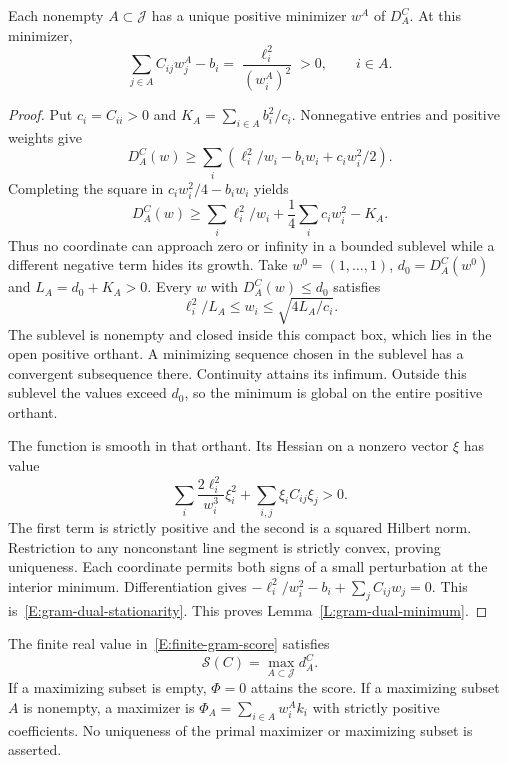 \begin{lemma}\label{L:gram-dual-minimum}
  Each nonempty $A\subset\mathcal J$ has a unique positive minimizer
  $w^A$ of $D_A^C$. At this minimizer,
  \begin{equation}\label{E:gram-dual-stationarity}
    \sum_{j\in A}C_{ij}w_j^A-b_i
    =\frac{\ell_i^2}{(w_i^A)^2}>0,\qquad i\in A.
  \end{equation}
\end{lemma}

\begin{proof}
  Put $c_i=C_{ii}>0$ and $K_A=\sum_{i\in A}b_i^2/c_i$.
  Nonnegative entries and positive weights give
  \[
    D_A^C(w)\ge
    \sum_i\left(\ell_i^2/w_i-b_iw_i+c_iw_i^2/2\right).
  \]
  Completing the square in $c_iw_i^2/4-b_iw_i$ yields
  \begin{equation}\label{E:gram-dual-coercivity}
    D_A^C(w)\ge
    \sum_i\ell_i^2/w_i+\frac14\sum_i c_iw_i^2-K_A.
  \end{equation}
  Thus no coordinate can approach zero or infinity in a bounded sublevel
  while a different negative term hides its growth.
  Take $w^0=(1,\ldots,1)$, $d_0=D_A^C(w^0)$ and $L_A=d_0+K_A>0$.
  Every $w$ with $D_A^C(w)\le d_0$ satisfies
  \[
    \ell_i^2/L_A\le w_i\le\sqrt{4L_A/c_i}.
  \]
  The sublevel is nonempty and closed inside this compact box, which
  lies in the open positive orthant. A minimizing sequence chosen in
  the sublevel has a convergent subsequence there. Continuity attains
  its infimum. Outside this sublevel the values exceed $d_0$, so the
  minimum is global on the entire positive orthant.

  The function is smooth in that orthant.
  Its Hessian on a nonzero vector $\xi$ has value
  \[
    \sum_i\frac{2\ell_i^2}{w_i^3}\xi_i^2
    +\sum_{i,j}\xi_iC_{ij}\xi_j>0.
  \]
  The first term is strictly positive and the second is a squared
  Hilbert norm. Restriction to any nonconstant line segment is
  strictly convex, proving uniqueness.
  Each coordinate permits both signs of a small perturbation at the
  interior minimum. Differentiation gives
  $-\ell_i^2/w_i^2-b_i+\sum_jC_{ij}w_j=0$.
  This is~\eqref{E:gram-dual-stationarity}.
  This proves Lemma~\ref{L:gram-dual-minimum}.
\end{proof}

\begin{proposition}\label{P:gram-positive-optimizer}
  The finite real value in~\eqref{E:finite-gram-score} satisfies
  \begin{equation}\label{E:gram-active-duality}
    \mathscr S(C)=\max_{A\subset\mathcal J}d_A^C .
  \end{equation}
  If a maximizing subset is empty, $\Phi=0$ attains the score.
  If a maximizing subset $A$ is nonempty, a maximizer is
  $\Phi_A=\sum_{i\in A}w_i^A k_i$ with strictly positive coefficients.
  No uniqueness of the primal maximizer or maximizing subset is asserted.
\end{proposition}

